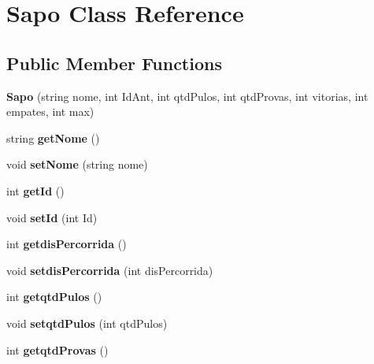 \hypertarget{classSapo}{}\section{Sapo Class Reference}
\label{classSapo}
\subsection*{Public Member Functions}
\begin{DoxyCompactItemize}
\item 
\mbox{\label{classSapo_af9c14c50668027d2f609ede033b30759}} 
{\bfseries Sapo} (string nome, int Id\+Ant, int qtd\+Pulos, int qtd\+Provas, int vitorias, int empates, int max)
\item 
\mbox{\label{classSapo_acfb11cd24152f00c9a4996f26f3ee39b}} 
string {\bfseries get\+Nome} ()
\item 
\mbox{\label{classSapo_a21384d051b2ddfc06f63405bcafd57b7}} 
void {\bfseries set\+Nome} (string nome)
\item 
\mbox{\label{classSapo_aa33722331db1073cbd0faa58445030f9}} 
int {\bfseries get\+Id} ()
\item 
\mbox{\label{classSapo_a24e4e96b04f9b9c9561ae81823a24f5a}} 
void {\bfseries set\+Id} (int Id)
\item 
\mbox{\label{classSapo_ae040852feb52835e3768cd858a7cf207}} 
int {\bfseries getdis\+Percorrida} ()
\item 
\mbox{\label{classSapo_a9547e1239b1582f12a02a4239a4f063e}} 
void {\bfseries setdis\+Percorrida} (int dis\+Percorrida)
\item 
\mbox{\label{classSapo_a4f50d4c0d75957e2d7c1db8b279e1d9a}} 
int {\bfseries getqtd\+Pulos} ()
\item 
\mbox{\label{classSapo_a5b702608378d9d1161d78c36a4abe164}} 
void {\bfseries setqtd\+Pulos} (int qtd\+Pulos)
\item 
\mbox{\label{classSapo_a93ddccb33857cf6ee3c4bf2554a0906e}} 
int {\bfseries getqtd\+Provas} ()

\end{DoxyCompactItemize}
